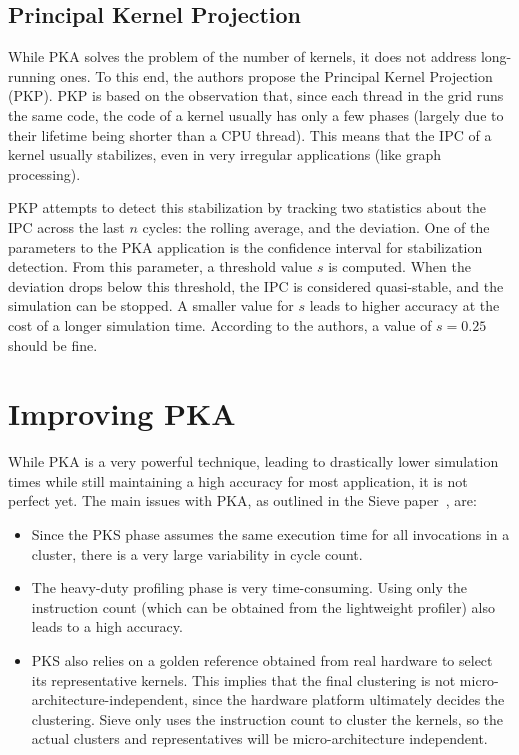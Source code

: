 \subsection{Principal Kernel Projection}\label{subsec:pkp}
While PKA solves the problem of the number of kernels, it does not address long-running ones.
To this end, the authors propose the Principal Kernel Projection (PKP).
PKP is based on the observation that, since each thread in the grid runs the same code, the code of a kernel usually has only a few phases (largely due to their lifetime being shorter than a CPU thread).
This means that the IPC of a kernel usually stabilizes, even in very irregular applications (like graph processing).

PKP attempts to detect this stabilization by tracking two statistics about the IPC across the last $n$ cycles: the rolling average, and the deviation.
One of the parameters to the PKA application is the confidence interval for stabilization detection.
From this parameter, a threshold value $s$ is computed.
When the deviation drops below this threshold, the IPC is considered quasi-stable, and the simulation can be stopped.
A smaller value for $s$ leads to higher accuracy at the cost of a longer simulation time.
According to the authors, a value of $s = 0.25$ should be fine.

\section{Improving PKA}\label{sec:improving-pka-sieve}
While PKA is a very powerful technique, leading to drastically lower simulation times while still maintaining a high accuracy for most application, it is not perfect yet.
The main issues with PKA, as outlined in the Sieve paper~\cite{sieve}, are:
\begin{itemize}
    \item Since the PKS phase assumes the same execution time for all invocations in a cluster, there is a very large variability in cycle count.
    \item The heavy-duty profiling phase is very time-consuming.
    Using only the instruction count (which can be obtained from the lightweight profiler) also leads to a high accuracy.
    \item PKS also relies on a golden reference obtained from real hardware to select its representative kernels.
    This implies that the final clustering is not micro-architecture-independent, since the hardware platform ultimately decides the clustering.
    Sieve only uses the instruction count to cluster the kernels, so the actual clusters and representatives will be micro-architecture independent.
\end{itemize}

